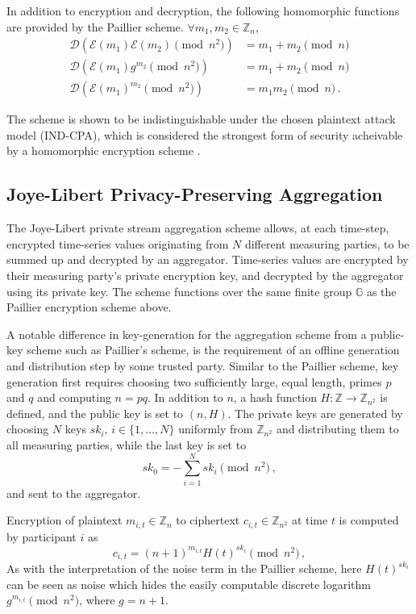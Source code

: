 \documentclass[twocolumn]{autart}    %
\begin{document}
In addition to encryption and decryption, the following homomorphic functions are provided by the Paillier scheme. $\forall m_1,m_2 \in \mathbb{Z}_n$,
\begin{align}
    \mathcal{D}(\mathcal{E}(m_1)\mathcal{E}(m_2)\pmod{n^2}) &= m_1+m_2\pmod{n} \\
    \mathcal{D}(\mathcal{E}(m_1)g^{m_2}\pmod{n^2}) &= m_1+m_2\pmod{n} \\
    \mathcal{D}(\mathcal{E}(m_1)^{m_2}\pmod{n^2}) &= m_1m_2\pmod{n}\,.
\end{align}

The scheme is shown to be indistinguishable under the chosen plaintext attack model (IND-CPA), which is considered the strongest form of security acheivable by a homomorphic encryption scheme \cite{}.

\subsection{Joye-Libert Privacy-Preserving Aggregation}
The Joye-Libert private stream aggregation scheme allows, at each time-step, encrypted time-series values originating from $N$ different measuring parties, to be summed up and decrypted by an aggregator. Time-series values are encrypted by their measuring party's private encryption key, and decrypted by the aggregator using its private key. The scheme functions over the same finite group $\mathbb{G}$ as the Paillier encryption scheme above.

A notable difference in key-generation for the aggregation scheme from a public-key scheme such as Paillier's scheme, is the requirement of an offline generation and distribution step by some trusted party. Similar to the Paillier scheme, key generation first requires choosing two sufficiently large, equal length, primes $p$ and $q$ and computing $n=pq$. In addition to $n$, a hash function $H:\mathbb{Z} \rightarrow \mathbb{Z}_{n^2}$ is defined, and the public key is set to $(n, H)$. The private keys are generated by choosing $N$ keys $sk_i,\,i \in \{1,\dots,N\}$ uniformly from $\mathbb{Z}_{n^2}$ and distributing them to all measuring parties, while the last key is set to
\begin{equation}
    sk_0 = -\sum^{N}_{i=1}sk_i \pmod{n^2}\,,
\end{equation}
and sent to the aggregator.

Encryption of plaintext $m_{i,t} \in \mathbb{Z}_n$ to ciphertext $c_{i,t} \in \mathbb{Z}_{n^2}$ at time $t$ is computed by participant $i$ as
\begin{equation}
    c_{i,t} = (n+1)^{m_{i,t}} H(t)^{sk_i} \pmod{n^2}\,,
\end{equation}
As with the interpretation of the noise term in the Paillier scheme, here $H(t)^{sk_i}$ can be seen as noise which hides the easily computable discrete logarithm $g^{m_{i,t}} \pmod{n^2}$, where $g=n+1$.
\end{document}
